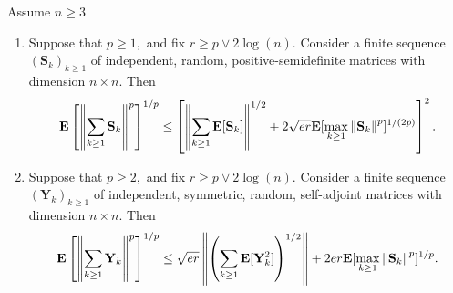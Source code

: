 \begin{ftheorem}
  Assume $n\ge 3$
  \begin{enumerate}[label={(\roman*)}]
    \item
  Suppose that
  $
    p \ge 1
    ,
  $
  and fix
  $
    r
    \ge
    p
    \lor
    2\log(n)
    .
  $
  Consider a finite sequence
  $
    (\mathbf{S}_k)_{k\ge 1}
  $
  of independent, random, positive-semidefinite matrices 
  with dimension 
  $
    n\times n.
  $
  Then
  \begin{gather}
      \mathbf{E}
      \left[
        \left\lVert
          \sum_{k\ge 1}
            \mathbf{S}_k
        \right\rVert
        ^{p}
      \right]
      ^{1/p}
      \le
      \left[ 
        \left\lVert
          \sum_{k\ge 1}
          \mathbf{E}
          [
            \mathbf{S}_k
          ]
        \right\rVert^{1/2}
        +
        2
        \sqrt{e r}
        \mathbf{E}
        [
          \max_{k\ge 1}
          \left\lVert
            \mathbf{S}_k
          \right\rVert
          ^p
        ]
        ^{1/(2p)}
      \right]
      ^2
      .
  \end{gather}
    \item
  Suppose that
  $
    p \ge 2
    ,
  $
  and fix
  $
    r
    \ge
    p
    \lor
    2\log(n)
    .
  $
  Consider a finite sequence
  $
    (\mathbf{Y}_k)_{k\ge 1}
  $
  of independent, symmetric, random, self-adjoint matrices 
  with dimension 
  $
    n\times n.
  $
  Then
  \begin{gather}
      \mathbf{E}
      \left[
        \left\lVert
          \sum_{k\ge 1}
            \mathbf{Y}_k
        \right\rVert
        ^{p}
      \right]
      ^{1/p}
      \le
        \sqrt{e r}
        \left\lVert
          \left( 
          \sum_{k\ge 1}
          \mathbf{E}
          [
            \mathbf{Y}_k^2
          ]
          \right)
          ^{1/2}
        \right\rVert
        +
        2
        er
        \mathbf{E}
        [
          \max_{k\ge 1}
          \left\lVert
            \mathbf{S}_k
          \right\rVert
          ^p
        ]
        ^{1/p}
      .
  \end{gather}

  \end{enumerate}
\end{ftheorem}
